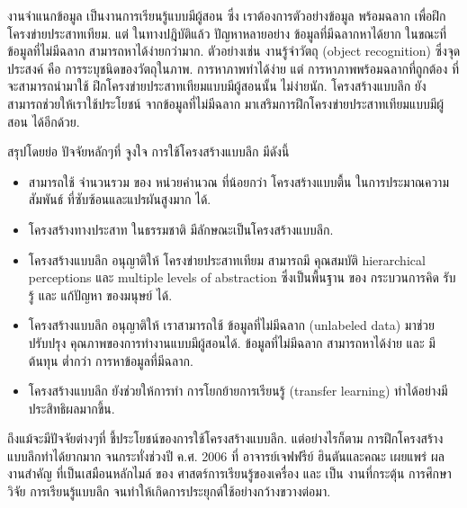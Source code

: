 งานจำแนกข้อมูล เป็นงานการเรียนรู้แบบมีผู้สอน ซึ่ง เราต้องการตัวอย่างข้อมูล พร้อมฉลาก เพื่อฝึกโครงข่ายประสาทเทียม.
แต่ ในทางปฎิบัติแล้ว ปัญหาหลายอย่าง ข้อมูลที่มีฉลากหาได้ยาก ในขณะที่ ข้อมูลที่ไม่มีฉลาก สามารถหาได้ง่ายกว่ามาก.
ตัวอย่างเช่น งานรู้จำวัตถุ (object recognition) ซึ่งจุดประสงค์ คือ การระบุชนิดของวัตถุในภาพ.
การหาภาพทำได้ง่าย 
แต่ การหาภาพพร้อมฉลากที่ถูกต้อง ที่จะสามารถนำมาใช้ ฝึกโครงข่ายประสาทเทียมแบบมีผู้สอนนั้น ไม่ง่ายนัก.
โครงสร้างแบบลึก ยังสามารถช่วยให้เราใช้ประโยชน์ จากข้อมูลที่ไม่มีฉลาก มาเสริมการฝึกโครงข่ายประสาทเทียมแบบมีผู้สอน ได้อีกด้วย.

สรุปโดยย่อ ปัจจัยหลักๆที่ จูงใจ การใช้โครงสร้างแบบลึก มีดังนี้
\begin{itemize}
\item สามารถใช้ จำนวนรวม ของ หน่วยคำนวณ ที่น้อยกว่า โครงสร้างแบบตื้น ในการประมาณความสัมพันธ์ ที่ซับซ้อนและแปรผันสูงมาก ได้.
\item โครงสร้างทางประสาท ในธรรมชาติ มีลักษณะเป็นโครงสร้างแบบลึก.
\item โครงสร้างแบบลึก อนุญาติให้ โครงข่ายประสาทเทียม สามารถมี คุณสมบัติ hierarchical perceptions และ multiple levels of abstraction ซึ่งเป็นพื้นฐาน ของ กระบวนการคิด รับรู้ และ แก้ปัญหา ของมนุษย์ ได้.
\item โครงสร้างแบบลึก อนุญาติให้ เราสามารถใช้ ข้อมูลที่ไม่มีฉลาก (unlabeled data) มาช่วยปรับปรุง คุณภาพของการทำงานแบบมีผู้สอนได้.
ข้อมูลที่ไม่มีฉลาก สามารถหาได้ง่าย และ มีต้นทุน ต่ำกว่า การหาข้อมูลที่มีฉลาก.
\item โครงสร้างแบบลึก ยังช่วยให้การทำ การโยกย้ายการเรียนรู้ (transfer learning) ทำได้อย่างมีประสิทธิผลมากขึ้น.
\end{itemize}

ถึงแม้จะมีปัจจัยต่างๆที่ ชี้ประโยชน์ของการใช้โครงสร้างแบบลึก.
แต่อย่างไรก็ตาม การฝึกโครงสร้างแบบลึกทำได้ยากมาก จนกระทั่งช่วงปี ค.ศ. 2006 ที่ อาจารย์เจฟฟรีย์ ฮินตันและคณะ \cite{HintonEtAl2006a} เผยแพร่ ผลงานสำคัญ ที่เป็นเสมือนหลักไมล์ ของ ศาสตร์การเรียนรู้ของเครื่อง และ เป็น งานที่กระตุ้น การศึกษาวิจัย การเรียนรู้แบบลึก จนทำให้เกิดการประยุกต์ใช้อย่างกว้างขวางต่อมา.
%


